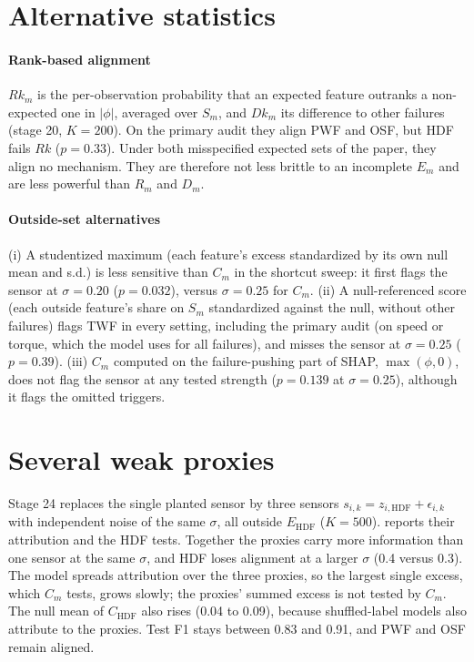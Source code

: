 \documentclass[10pt]{article}
\begin{document}
\section{Alternative statistics}

\paragraph{Rank-based alignment} $Rk_m$ is the per-observation probability that an expected feature outranks a non-expected one in $|\phi|$, averaged over $S_m$, and $Dk_m$ its difference to other failures (stage 20, $K=200$). On the primary audit they align PWF and OSF, but HDF fails $Rk$ ($p=0.33$). Under both misspecified expected sets of the paper, they align no mechanism. They are therefore not less brittle to an incomplete $E_m$ and are less powerful than $R_m$ and $D_m$.

\paragraph{Outside-set alternatives} (i) A studentized maximum (each feature's excess standardized by its own null mean and s.d.) is less sensitive than $C_m$ in the shortcut sweep: it first flags the sensor at $\sigma=0.20$ ($p=0.032$), versus $\sigma=0.25$ for $C_m$. (ii) A null-referenced score (each outside feature's share on $S_m$ standardized against the null, without other failures) flags TWF in every setting, including the primary audit (on speed or torque, which the model uses for all failures), and misses the sensor at $\sigma=0.25$ ($p=0.39$). (iii) $C_m$ computed on the failure-pushing part of SHAP, $\max(\phi,0)$, does not flag the sensor at any tested strength ($p=0.139$ at $\sigma=0.25$), although it flags the omitted triggers.

\section{Several weak proxies}

Stage 24 replaces the single planted sensor by three sensors $s_{i,k}=z_{i,\mathrm{HDF}}+\epsilon_{i,k}$ with independent noise of the same $\sigma$, all outside $E_{\mathrm{HDF}}$ ($K=500$).  reports their attribution and the HDF tests. Together the proxies carry more information than one sensor at the same $\sigma$, and HDF loses alignment at a larger $\sigma$ (0.4 versus 0.3). The model spreads attribution over the three proxies, so the largest single excess, which $C_m$ tests, grows slowly; the proxies' summed excess is not tested by $C_m$. The null mean of $C_{\mathrm{HDF}}$ also rises (0.04 to 0.09), because shuffled-label models also attribute to the proxies. Test F1 stays between 0.83 and 0.91, and PWF and OSF remain aligned.
\end{document}
